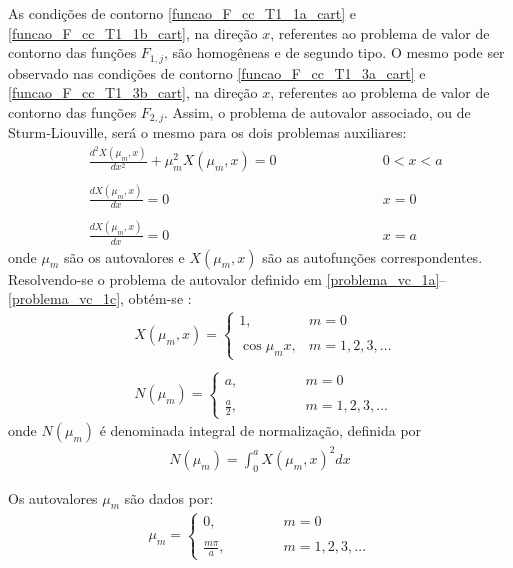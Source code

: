 As condições de contorno \eqref{funcao_F_cc_T1_1a_cart} e \eqref{funcao_F_cc_T1_1b_cart}, na direção $x$, referentes ao problema de valor de contorno das funções $F_{1, j}$, são homogêneas e de segundo tipo. O
mesmo pode ser observado nas condições de contorno \eqref{funcao_F_cc_T1_3a_cart} e \eqref{funcao_F_cc_T1_3b_cart}, na direção $x$, referentes ao problema de valor de contorno das funções $F_{2, j}$.
Assim, o problema de autovalor associado, ou de Sturm-Liouville, será o mesmo para os dois problemas auxiliares:
\begin{subequations}
	\begin{alignat}{2}
	& \frac{d^2 X(\mu_m, x)}{d x^2} + \mu_m^2 X(\mu_m, x) = 0 \quad\quad\quad\quad\quad\quad && 0 < x < a \label{problema_vc_1a} \\ \nonumber \\
	& \frac{d X(\mu_m, x)}{d x} = 0 && x = 0 \label{problema_vc_1b} \\ \nonumber \\
	& \frac{d X(\mu_m, x)}{d x} = 0 && x = a \label{problema_vc_1c}
	\end{alignat}
\end{subequations}
onde $\mu_m$ são os autovalores e $X(\mu_m, x)$ são as autofunções correspondentes. Resolvendo-se o problema de autovalor definido em \eqref{problema_vc_1a}--\eqref{problema_vc_1c}, obtém-se \citep{livro_ozisik}:
\begin{align}
& X(\mu_m, x) = \left\lbrace
\begin{array}{ll}
1, & m = 0 \\ \\
\cos \mu_m x, & m = 1,2,3,\ldots
\end{array}
\right . \label{definicao_das_autofuncoes} \\ \nonumber \\
& N(\mu_m) = \left\lbrace
\begin{array}{ll}
a, \quad\quad\quad\quad & m = 0 \\ \\
\displaystyle\frac{a}{2}, & m = 1,2,3,\ldots
\end{array}
\right. \label{valor_integral_norm}
\end{align}
onde $N(\mu_m)$ é denominada integral de normalização, definida por
\begin{align}
N(\mu_m) = \int_0^a X(\mu_m, x)^2 dx
\end{align}

Os autovalores $\mu_m$ são dados por:
\begin{align}
\mu_m = \left\lbrace
\begin{array}{ll}
0, \quad\quad\quad\quad & m = 0 \\ \\
\displaystyle\frac{m\pi}{a}, & m = 1,2,3,\ldots
\end{array}
\right.
\end{align}

